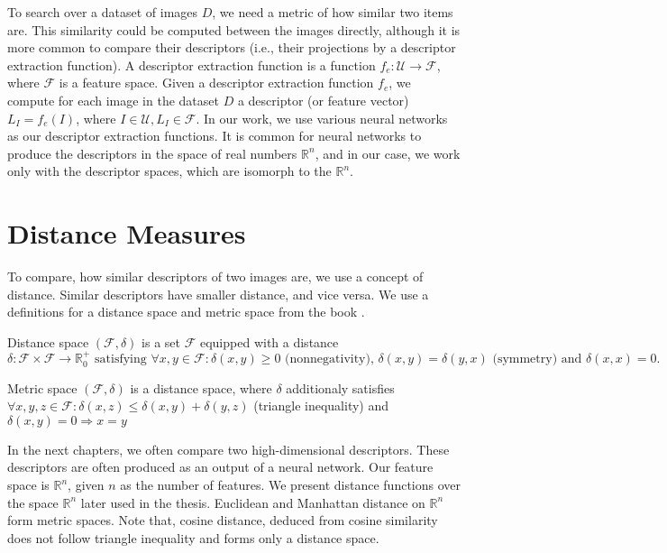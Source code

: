 To search over a dataset of images $D$, we need a metric of how similar two items are. This similarity could be computed between the images directly, although it is more common to compare their descriptors (i.e., their  projections by a descriptor extraction function). A descriptor extraction function is a function $f_e: \mathcal{U} \rightarrow \mathcal{F}$, where $\mathcal{F}$ is a feature space. Given a descriptor extraction function $f_e$, we compute for each image in the dataset $D$ a descriptor (or feature vector) $L_I = f_e(I)$, where $I \in \mathcal{U}, L_I \in \mathcal{F}$. In our work, we use various neural networks as our descriptor extraction functions. It is common for neural networks to produce the descriptors in the space of real numbers $\mathbb{R}^n$, and in our case, we work only with the descriptor spaces, which are isomorph to the $\mathbb{R}^n$.

\section{Distance Measures}
\label{s:distance_measures}

To compare, how similar descriptors of two images are, we use a concept of distance. Similar descriptors have smaller distance, and vice versa. We use a definitions for a distance space and metric space from the book \cite{deza2009encyclopedia}.

\theoremstyle{definition}
\begin{definition}{Distance space}
$(\mathcal{F}, \delta )$ is a set $\mathcal{F}$ equipped
with a distance $\delta : \mathcal{F} \times \mathcal{F} \rightarrow \mathbb{R}^+_0 \text{ satisfying } \forall x, y \in \mathcal{F}: \delta(x, y) \geq 0 \text{ (nonnegativity), } \delta(x, y) = \delta(y, x) \text{ (symmetry) and } \delta(x, x) = 0.$
\end{definition}

\theoremstyle{definition}
\begin{definition}{Metric space}
$(\mathcal{F}, \delta)$ is a distance space, where $\delta$ additionaly satisfies $\forall x, y, z \in \mathcal{F} : \delta(x,z) \leq \delta(x,y) + \delta(y,z)$ (triangle inequality) and $\delta(x, y) = 0 \Rightarrow x = y$
\end{definition}

In the next chapters, we often compare two high-dimensional descriptors. These descriptors are often produced as an output of a neural network. Our feature space is $\mathbb{R}^n$, given $n$ as the number of features. We present distance functions over the space $\mathbb{R}^n$ later used in the thesis. Euclidean and Manhattan distance on $\mathbb{R}^n$ form metric spaces. Note that, cosine distance, deduced from cosine similarity does not follow triangle inequality and forms only a distance space.

